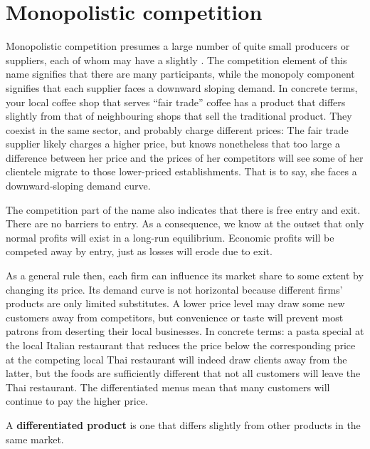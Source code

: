 \section{Monopolistic competition}\label{sec:ch11sec3}

Monopolistic competition presumes a large number of quite small producers or suppliers, each of whom may have a slightly . The competition element of this name signifies that there are many participants, while the monopoly component signifies that each supplier faces a downward sloping demand. In concrete terms, your local coffee shop that serves ``fair trade'' coffee has a product that differs slightly from that of neighbouring shops that sell the traditional product. They coexist in the same sector, and probably charge different prices: The fair trade supplier likely charges a higher price, but knows nonetheless that too large a difference between her price and the prices of her competitors will see some of her clientele migrate to those lower-priced establishments. That is to say, she faces a downward-sloping demand curve.

The competition part of the name also indicates that there is free entry and exit. There are no barriers to entry. As a consequence, we know at the outset that only normal profits will exist in a long-run equilibrium. Economic profits will be competed away by entry, just as losses will erode due to exit.

As a general rule then, each firm can influence its market share to some extent by changing its price. Its demand curve is not horizontal because different firms' products are only limited substitutes. A lower price level may draw some new customers away from competitors, but convenience or taste will prevent most patrons from deserting their local businesses. In concrete terms: a pasta special at the local Italian restaurant that reduces the price below the corresponding price at the competing local Thai restaurant will indeed draw clients away from the latter, but the foods are sufficiently different that not all customers will leave the Thai restaurant. The differentiated menus mean that many customers will continue to pay the higher price.

\begin{DefBox}
A \textbf{differentiated product} is one that differs slightly from other products in the same market.
\end{DefBox}

